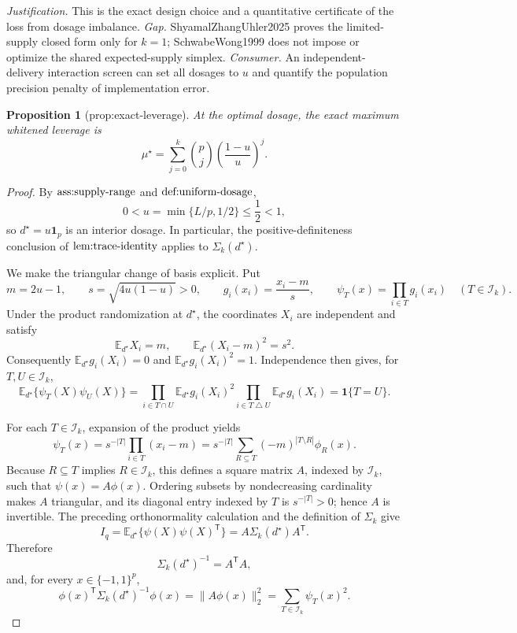 \documentclass{article}
\newtheorem{proposition}{Proposition}
\begin{document}
\par\smallskip\noindent \textit{Justification.} This is the exact design choice and a quantitative certificate of the loss from dosage imbalance. \textit{Gap.} ShyamalZhangUhler2025 proves the limited-supply closed form only for \(k=1\); SchwabeWong1999 does not impose or optimize the shared expected-supply simplex. \textit{Consumer.} An independent-delivery interaction screen can set all dosages to \(u\) and quantify the population precision penalty of implementation error.

\begin{proposition}[prop:exact-leverage]\label{prop:exact-leverage}
At the optimal dosage, the exact maximum whitened leverage is \[\mu^\star=\sum_{j=0}^{k}\binom pj\left(\frac{1-u}{u}\right)^j.\]
\end{proposition}
\begin{proof}
By \(\textnormal{ass:supply-range}\) and \(\textnormal{def:uniform-dosage}\),
\[
 0<u=\min\{L/p,1/2\}\le \frac12<1,
\]
so \(d^\star=u\mathbf 1_p\) is an interior dosage.  In particular, the positive-definiteness conclusion of \(\textnormal{lem:trace-identity}\) applies to \(\Sigma_k(d^\star)\).

We make the triangular change of basis explicit.  Put
\[
 m=2u-1,
 \qquad
 s=\sqrt{4u(1-u)}>0,
 \qquad
 g_i(x_i)=\frac{x_i-m}{s},
 \qquad
 \psi_T(x)=\prod_{i\in T}g_i(x_i)
 \quad(T\in\mathcal I_k).
\]
Under the product randomization at \(d^\star\), the coordinates \(X_i\) are independent and satisfy
\[
 \mathbb E_{d^\star}X_i=m,
 \qquad
 \mathbb E_{d^\star}(X_i-m)^2=s^2.
\]
Consequently \(\mathbb E_{d^\star}g_i(X_i)=0\) and \(\mathbb E_{d^\star}g_i(X_i)^2=1\).  Independence then gives, for \(T,U\in\mathcal I_k\),
\[
 \mathbb E_{d^\star}\{\psi_T(X)\psi_U(X)\}
 =\prod_{i\in T\cap U}\mathbb E_{d^\star}g_i(X_i)^2
   \prod_{i\in T\mathbin\triangle U}\mathbb E_{d^\star}g_i(X_i)
 =\mathbf 1\{T=U\}.
\]

For each \(T\in\mathcal I_k\), expansion of the product yields
\[
 \psi_T(x)
 =s^{-|T|}\prod_{i\in T}(x_i-m)
 =s^{-|T|}\sum_{R\subseteq T}(-m)^{|T\setminus R|}\phi_R(x).
\]
Because \(R\subseteq T\) implies \(R\in\mathcal I_k\), this defines a square matrix \(A\), indexed by \(\mathcal I_k\), such that \(\psi(x)=A\phi(x)\).  Ordering subsets by nondecreasing cardinality makes \(A\) triangular, and its diagonal entry indexed by \(T\) is \(s^{-|T|}>0\); hence \(A\) is invertible.  The preceding orthonormality calculation and the definition of \(\Sigma_k\) give
\[
 I_q
 =\mathbb E_{d^\star}\{\psi(X)\psi(X)^{\mathsf T}\}
 =A\Sigma_k(d^\star)A^{\mathsf T}.
\]
Therefore
\[
 \Sigma_k(d^\star)^{-1}=A^{\mathsf T}A,
\]
and, for every \(x\in\{-1,1\}^p\),
\[
 \phi(x)^{\mathsf T}\Sigma_k(d^\star)^{-1}\phi(x)
 =\|A\phi(x)\|_2^2
 =\sum_{T\in\mathcal I_k}\psi_T(x)^2.
\]


\end{proof}
\end{document}

